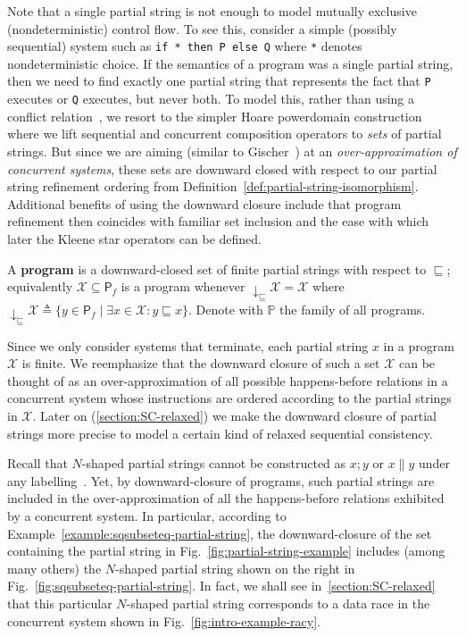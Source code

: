 \documentclass{llncs}
\newcommand{\set}[1]{\mbox{$\{ #1 \}$}}
\newcommand{\alt}{\mathrel{|}}
\newcommand{\deq}{\triangleq}
\newcommand{\sP}{\mathsf{P}}
\newcommand{\cX}{\mathcal{X}}
\newcommand{\bbP}{\mathbb{P}}
\newcommand{\defn}[1]{\textbf{#1}}
\begin{document}
Note that a single partial string is not enough to model mutually exclusive (nondeterministic) control flow. To see this, consider a simple (possibly sequential) system such as \texttt{if * then P else Q} where \texttt{*} denotes nondeterministic choice. If the semantics of a program was a single partial string, then we need to find exactly one partial string that represents the fact that \texttt{P} executes or \texttt{Q} executes, but never both. To model this, rather than using a conflict relation~\cite{NPW1981}, we resort to the simpler Hoare powerdomain construction where we lift sequential and concurrent composition operators to \emph{sets} of partial strings. But since we are aiming (similar to Gischer~\cite{G1988}) at an \emph{over-approximation of concurrent systems}, these sets are downward closed with respect to our partial string refinement ordering from Definition~\ref{def:partial-string-isomorphism}. Additional benefits of using the downward closure include that program refinement then coincides with familiar set inclusion and the ease with which later the Kleene star operators can be defined.

\begin{definition}[Program]
\label{def:program}
A \defn{program} is a downward-closed set of finite partial strings with respect to $\sqsubseteq$; equivalently $\cX \subseteq \sP_f$ is a program whenever $\downarrow_\sqsubseteq \cX = \cX$ where $\downarrow_\sqsubseteq \cX \deq \set{y \in \sP_f \alt \exists x \in \cX \colon y \sqsubseteq x}$. Denote with $\bbP$ the family of all programs.
\end{definition}

Since we only consider systems that terminate, each partial string $x$ in a program $\cX$ is finite. We reemphasize that the downward closure of such a set $\cX$ can be thought of as an over-approximation of all possible happens-before relations in a concurrent system whose instructions are ordered according to the partial strings in $\cX$. Later on (\autoref{section:SC-relaxed}) we make the downward closure of partial strings more precise to model a certain kind of relaxed sequential consistency.

\begin{example}
\label{example:program}
Recall that $N$-shaped partial strings cannot be constructed as $x ; y$ or $x \parallel y$ under any labelling~\cite{P1986}. Yet, by downward-closure of programs, such partial strings are included in the over-approximation of all the happens-before relations exhibited by a concurrent system. In particular, according to Example~\ref{example:sqsubseteq-partial-string}, the downward-closure of the set containing the partial string in Fig.~\ref{fig:partial-string-example} includes (among many others) the $N$-shaped partial string shown on the right in Fig.~\ref{fig:sqsubseteq-partial-string}. In fact, we shall see in~\autoref{section:SC-relaxed} that this particular $N$-shaped partial string corresponds to a data race in the concurrent system shown in Fig.~\ref{fig:intro-example-racy}.
\end{example}
\end{document}
